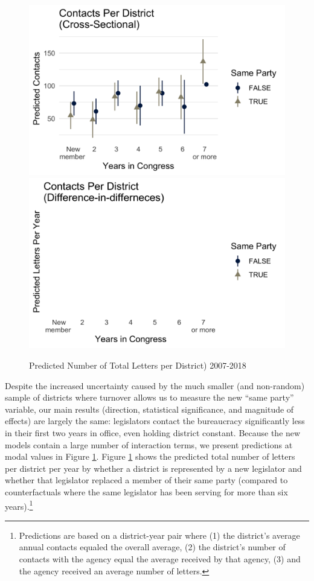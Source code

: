 \begin{figure}[hbt!]
\centering
\caption{Predicted Number of Total Letters per District) 2007-2018} \label{f:m-district-predicted-party}
\includegraphics[width = .49\textwidth]{figs/m-district-predicted-2}
\includegraphics[width = .49\textwidth]{figs/m-district-predicted-4}
\end{figure}

Despite the increased uncertainty caused by the much smaller (and non-random) sample of districts where turnover allows us to measure the new “same party” variable, our main results (direction, statistical significance, and magnitude of effects) are largely the same: legislators contact the bureaucracy significantly less in their first two years in office, even holding district constant. Because the new models contain a large number of interaction terms, we present predictions at modal values in Figure \ref{f:m-district-predicted-party}.
Figure \ref{f:m-district-predicted-party} shows the predicted total number of letters per district per year by whether a district is represented by a new legislator and whether that legislator replaced a member of their same party (compared to counterfactuals where the same legislator has been serving for more than six years).\footnote{Predictions are based on a district-year pair where (1) the district's average annual contacts equaled the overall average, (2) the district's number of contacts with the agency equal the average received by that agency, (3) and the agency received an average number of letters.} 


